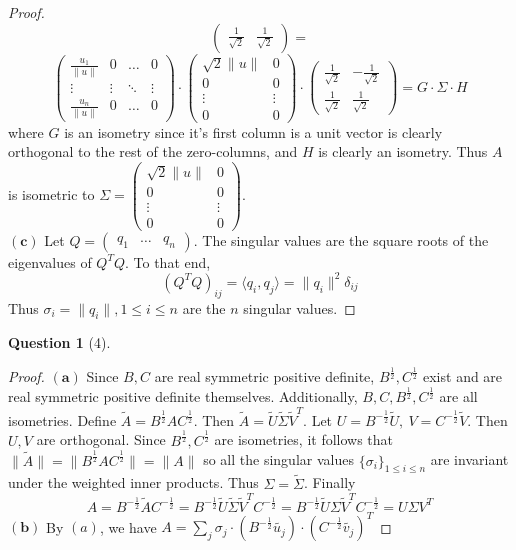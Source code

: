 \documentclass[11pt]{article}
\theoremstyle{quest}
\newtheorem*{question}{Question}
\begin{document}
\begin{proof}
$$\begin{pmatrix}
\frac{1}{\sqrt{2}} & \frac{1}{\sqrt{2}}
\end{pmatrix} =$$ $$\begin{pmatrix}
\frac{u_1}{\|u\|} & 0 & \ldots & 0 \\
\vdots & \vdots & \ddots & \vdots \\
\frac{u_n}{\|u\|} & 0 & \ldots & 0
\end{pmatrix} \cdot \begin{pmatrix}
\sqrt{2}\|u\| & 0 \\
0 & 0 \\
\vdots & \vdots \\
0 & 0
\end{pmatrix} \cdot \begin{pmatrix}
\frac{1}{\sqrt{2}} & -\frac{1}{\sqrt{2}} \\
\frac{1}{\sqrt{2}} & \frac{1}{\sqrt{2}}
\end{pmatrix} = G \cdot \Sigma \cdot H$$
where $G$ is an isometry since it's first column is a unit vector is clearly orthogonal to the rest of the zero-columns, and $H$ is clearly an isometry. Thus $A$ is isometric to $\Sigma = \begin{pmatrix}
\sqrt{2}\|u\| & 0 \\
0 & 0 \\
\vdots & \vdots \\
0 & 0
\end{pmatrix}$.
\\$\mathbf{(c)}$ Let $Q = \begin{pmatrix}
q_1 & \ldots & q_n
\end{pmatrix} $. The singular values are the square roots of the eigenvalues of $Q^TQ$. To that end,
$$(Q^TQ)_{ij} = \langle q_i, q_j \rangle = \|q_i\|^2 \delta_{ij}$$
Thus $\sigma_i = \|q_i\|, 1 \le i \le n$ are the $n$ singular values.
\end{proof}

\begin{question}[4]
\end{question}
\begin{proof}
$\mathbf{(a)}$ Since $B, C$ are real symmetric positive definite, $B^{\frac{1}{2}}, C^{\frac{1}{2}}$ exist and are real symmetric positive definite themselves. Additionally, $B, C, B^{\frac{1}{2}}, C^{\frac{1}{2}}$ are all isometries. Define $\tilde{A} = B^{\frac{1}{2}} A C^{\frac{1}{2}}$. Then $\tilde{A} = \tilde{U}  \tilde{\Sigma} \tilde{V}^T$. Let $U = B^{-\frac{1}{2}} \tilde{U},\ V = C^{-\frac{1}{2}} \tilde{V}$. Then $U, V$ are orthogonal. Since $B^{\frac{1}{2}}, C^{\frac{1}{2}}$ are isometries, it follows that $\|\tilde{A}\| = \|B^{\frac{1}{2}} A C^{\frac{1}{2}}\| = \|A\|$ so all the singular values $\{\sigma_i\}_{1 \le i \le n}$ are invariant under the weighted inner products. Thus $\Sigma = \tilde{\Sigma}$. Finally
$$A = B^{-\frac{1}{2}} \tilde{A} C^{-\frac{1}{2}} = B^{-\frac{1}{2}} \tilde{U}  \tilde{\Sigma} \tilde{V}^T C^{-\frac{1}{2}} = B^{-\frac{1}{2}} \tilde{U}  \Sigma \tilde{V}^T C^{-\frac{1}{2}} = U \Sigma V^T$$
$\mathbf{(b)}$ By $(a)$, we have $A = \sum_j \sigma_j \cdot (B^{-\frac{1}{2}} \tilde{u_j}) \cdot (C^{-\frac{1}{2}} \tilde{v_j})^T$
\end{proof}
\end{document}
